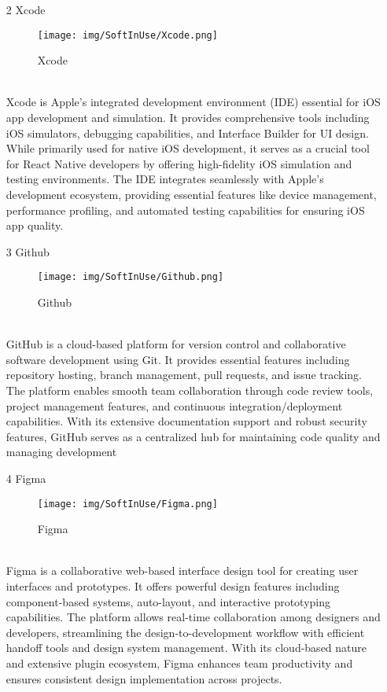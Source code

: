 \documentclass[conference]{IEEEtran}
\begin{document}
\begin{enumerate}
\begin{itemize}
\begin{itemize}
\begin{enumerate}
\item[2] Xcode
\begin{figure}[h]
\centering
\texttt{[image: img/SoftInUse/Xcode.png]}
\caption{Xcode} 
\end{figure}\\
Xcode is Apple's integrated development environment (IDE) essential for iOS app development and simulation. It provides comprehensive tools including iOS simulators, debugging capabilities, and Interface Builder for UI design. While primarily used for native iOS development, it serves as a crucial tool for React Native developers by offering high-fidelity iOS simulation and testing environments. The IDE integrates seamlessly with Apple's development ecosystem, providing essential features like device management, performance profiling, and automated testing capabilities for ensuring iOS app quality.\\

\item[3] Github
\begin{figure}[h]
\centering
\texttt{[image: img/SoftInUse/Github.png]}
\caption{Github} 
\end{figure}\\
GitHub is a cloud-based platform for version control and collaborative software development using Git. It provides essential features including repository hosting, branch management, pull requests, and issue tracking. The platform enables smooth team collaboration through code review tools, project management features, and continuous integration/deployment capabilities. With its extensive documentation support and robust security features, GitHub serves as a centralized hub for maintaining code quality and managing development \\

\item[4] Figma
\begin{figure}[h]
\centering
\texttt{[image: img/SoftInUse/Figma.png]}
\caption{Figma} 
\end{figure}\\
Figma is a collaborative web-based interface design tool for creating user interfaces and prototypes. It offers powerful design features including component-based systems, auto-layout, and interactive prototyping capabilities. The platform allows real-time collaboration among designers and developers, streamlining the design-to-development workflow with efficient handoff tools and design system management. With its cloud-based nature and extensive plugin ecosystem, Figma enhances team productivity and ensures consistent design implementation across projects.\\


\end{enumerate}
\end{itemize}
\end{itemize}
\end{enumerate}
\end{document}
